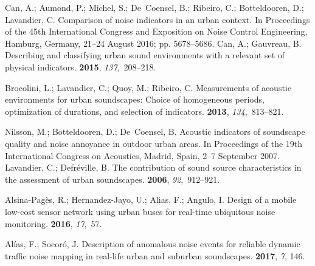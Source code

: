 \documentclass[sensors,article,accept,moreauthors,pdftex,10pt,a4paper]{mdpi}
\begin{document}
\begin{thebibliography}{999}
Can, A.; Aumond, P.; Michel, S.; De~Coensel, B.; Ribeiro, C.; Botteldooren, D.;
  Lavandier, C.
\newblock Comparison of noise indicators in an urban context.
\newblock  In Proceedings of the 45th International Congress and Exposition on Noise Control
  Engineering, {Hamburg, Germany, 21--24 August }2016; pp. 5678--5686.
Can, A.; Gauvreau, B.
\newblock Describing and classifying urban sound environments with a relevant
  set of physical indicators.
 {\bf 2015}, {\em 137},~208--218.

Brocolini, L.; Lavandier, C.; Quoy, M.; Ribeiro, C.
\newblock Measurements of acoustic environments for urban soundscapes: Choice
  of homogeneous periods, optimization of durations, and selection of
  indicators.
 {\bf 2013}, {\em 134},~813--821.

Nilsson, M.; Botteldooren, D.; De~Coensel, B.
\newblock Acoustic indicators of soundscape quality and noise annoyance in
  outdoor urban areas.
\newblock  In Proceedings of the 19th International Congress on Acoustics, {Madrid, Spain, 2--7 September} 2007.
Lavandier, C.; Defr{\'e}ville, B.
\newblock The contribution of sound source characteristics in the assessment of
  urban soundscapes.
 {\bf 2006}, {\em
  92},~912--921.

Alsina-Pag{\`e}s, R.; Hernandez-Jayo, U.; Al{\'\i}as, F.; Angulo, I.
\newblock Design of a mobile low-cost sensor network using urban buses for
  real-time ubiquitous noise monitoring.
 {\bf 2016}, {\em 17},~57.

Alías, F.; Socoró, J.
\newblock Description of anomalous noise events for reliable dynamic traffic
  noise mapping in real-life urban and suburban soundscapes.
 {\bf 2017}, {\em 7}, 146.


\end{thebibliography}
\end{document}
